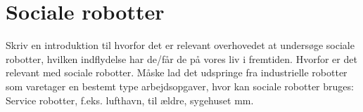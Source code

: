 \chapter{Sociale robotter}
\label{SocialRobot}
%
Skriv en introduktion til hvorfor det er relevant overhovedet at undersøge sociale robotter, hvilken indflydelse har de/får de på vores liv i fremtiden. Hvorfor er det relevant med sociale robotter. Måske lad det udspringe fra industrielle robotter som varetager en bestemt type arbejdsopgaver, hvor kan sociale robotter bruges: Service robotter, f.eks. lufthavn, til ældre, sygehuset mm. 
